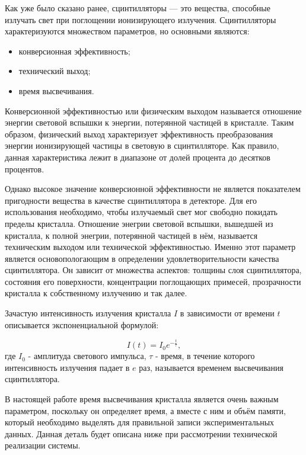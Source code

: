 Как уже было сказано ранее, сцинтилляторы --- это вещества, способные излучать свет при поглощении ионизирующего излучения. Сцинтилляторы характеризуются множеством параметров, но основными являются:
\begin{itemize}
    \item конверсионная эффективность;
    \item технический выход;
    \item время высвечивания.
\end{itemize}\par
Конверсионной эффективностью или физическим выходом называется отношение энергии световой вспышки к энергии, потерянной частицей в кристалле. Таким образом, физический выход характеризует эффективность преобразования энергии ионизирующей частицы в световую в сцинтилляторе. Как правило, данная характеристика лежит в диапазоне от долей процента до десятков процентов.\par
Однако высокое значение конверсионной эффективности не является показателем пригодности вещества в качестве сцинтиллятора в детекторе. Для его использования необходимо, чтобы излучаемый свет мог свободно покидать пределы кристалла. Отношение энегрии световой вспышки, вышедшей из кристалла, к полной энегрии, потерянной частицей в нём, называется техническим выходом или технической эффективностью. Именно этот параметр является основопологающим в определении удовлетворительности качества сцинтиллятора. Он зависит от множества аспектов: толщины слоя сцинтиллятора, состояния его поверхности, концентрации поглощающих примесей, прозрачности кристалла к собственному излучению и так далее.\par
Зачастую интенсивность излучения кристалла $I$ в зависимости от времени $t$ описывается экспоненциальной формулой:\par
\begin{equation}
    I(t) = I_0 e^{-{\frac t {\tau}}},
\end{equation}
где $I_0$ - амплитуда светового импульса, $\tau$ - время, в течение которого интенсивность излучения падает в $e$ раз, называется временем высвечивания сцинтиллятора.\par
В настоящей работе время высвечивания кристалла является очень важным параметром, поскольку он определяет время, а вместе с ним и объём памяти, который необходимо выделять для правильной записи экспериментальных данных. Данная деталь будет описана ниже при рассмотрении технической реализации системы.
